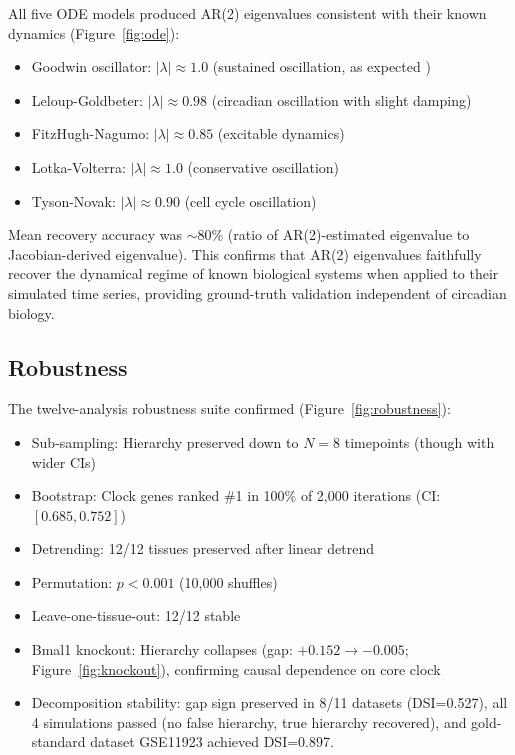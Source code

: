 \documentclass[11pt,letterpaper]{article}
\begin{document}
All five ODE models produced AR(2) eigenvalues consistent with their known dynamics (Figure~\ref{fig:ode}):
\begin{itemize}
\item Goodwin oscillator: $|\lambda| \approx 1.0$ (sustained oscillation, as expected \citep{goodwin1965oscillatory})
\item Leloup-Goldbeter: $|\lambda| \approx 0.98$ (circadian oscillation with slight damping)
\item FitzHugh-Nagumo: $|\lambda| \approx 0.85$ (excitable dynamics)
\item Lotka-Volterra: $|\lambda| \approx 1.0$ (conservative oscillation)
\item Tyson-Novak: $|\lambda| \approx 0.90$ (cell cycle oscillation)
\end{itemize}

Mean recovery accuracy was $\sim$80\% (ratio of AR(2)-estimated eigenvalue to Jacobian-derived eigenvalue). This confirms that AR(2) eigenvalues faithfully recover the dynamical regime of known biological systems when applied to their simulated time series, providing ground-truth validation independent of circadian biology.

\subsection{Robustness}

The twelve-analysis robustness suite confirmed (Figure~\ref{fig:robustness}):
\begin{itemize}
\item Sub-sampling: Hierarchy preserved down to $N = 8$ timepoints (though with wider CIs)
\item Bootstrap: Clock genes ranked \#1 in 100\% of 2,000 iterations (CI: $[0.685, 0.752]$)
\item Detrending: 12/12 tissues preserved after linear detrend
\item Permutation: $p < 0.001$ (10,000 shuffles)
\item Leave-one-tissue-out: 12/12 stable
\item Bmal1 knockout: Hierarchy collapses (gap: $+0.152 \rightarrow -0.005$; Figure~\ref{fig:knockout}), confirming causal dependence on core clock
\item Decomposition stability: gap sign preserved in 8/11 datasets (DSI=0.527), all 4 simulations passed (no false hierarchy, true hierarchy recovered), and gold-standard dataset GSE11923 achieved DSI=0.897.
\end{itemize}
\end{document}

